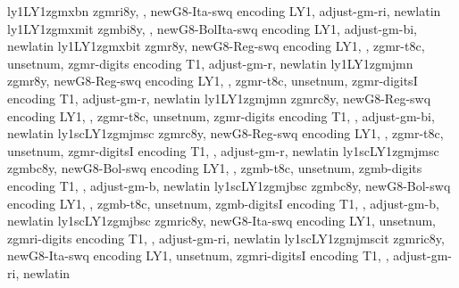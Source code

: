 {ly1}{LY1}{zgmx}{b}{n}{}
%
{zgmri8y,%
\metrics {},%
newG8-Ita-swq encoding LY1,%
adjust-gm-ri,%
newlatin}
{ly1}{LY1}{zgmx}{m}{it}{}
%
{zgmbi8y,%
\metrics {},%
newG8-BolIta-swq encoding LY1,%
adjust-gm-bi,%
newlatin}
{ly1}{LY1}{zgmx}{b}{it}{}
%
{zgmr8y,%
newG8-Reg-swq encoding LY1,%
\metrics {},%
zgmr-t8c,%
unsetnum,%
zgmr-digits encoding T1,%
adjust-gm-r,%
newlatin}
{ly1}{LY1}{zgmj}{m}{n}{}
%
{zgmr8y,%
newG8-Reg-swq encoding LY1,%
\metrics {},%
zgmr-t8c,%
unsetnum,%
zgmr-digitsI encoding T1,%
adjust-gm-r,%
newlatin}
{ly1}{LY1}{zgmj}{m}{n}{}
%
{zgmrc8y,%
newG8-Reg-swq encoding LY1,%
\metrics {},%
zgmr-t8c,%
unsetnum,%
zgmr-digits encoding T1,%
\metrics {}  ,%
adjust-gm-bi,%
newlatin}
{ly1sc}{LY1}{zgmj}{m}{sc}{}
%
{zgmrc8y,%
newG8-Reg-swq encoding LY1,%
\metrics {},%
zgmr-t8c,%
unsetnum,%
zgmr-digitsI encoding T1,%
\metrics {}  ,%
adjust-gm-r,%
newlatin}
{ly1sc}{LY1}{zgmj}{m}{sc}{}
%
{zgmbc8y,%
newG8-Bol-swq encoding LY1,%
\metrics {},%
zgmb-t8c,%
unsetnum,%
zgmb-digits encoding T1,%
\metrics {}  ,%
adjust-gm-b,%
newlatin}
{ly1sc}{LY1}{zgmj}{b}{sc}{}
%
{zgmbc8y,%
newG8-Bol-swq encoding LY1,%
\metrics {},%
zgmb-t8c,%
unsetnum,%
zgmb-digitsI encoding T1,%
\metrics {}  ,%
adjust-gm-b,%
newlatin}
{ly1sc}{LY1}{zgmj}{b}{sc}{}
%
{zgmric8y,%
newG8-Ita-swq encoding LY1,%
unsetnum,%
zgmri-digits encoding T1,%
\metrics {}  ,%
adjust-gm-ri,%
newlatin}
{ly1sc}{LY1}{zgmj}{m}{scit}{}
%
{zgmric8y,%
newG8-Ita-swq encoding LY1,%
unsetnum,%
zgmri-digitsI encoding T1,%
\metrics {}  ,%
adjust-gm-ri,%
newlatin}
